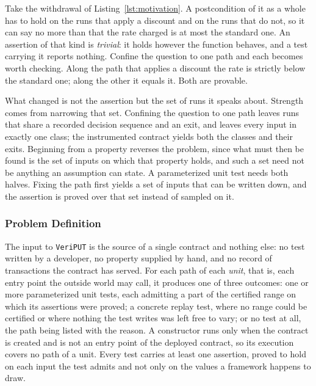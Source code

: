 \documentclass[manuscript,anonymous]{acmart}
\newcommand{\tool}[1]{\texttt{#1}}
\begin{document}
Take the withdrawal of Listing~\ref{lst:motivation}. A postcondition of it as a
whole has to hold on the runs that apply a discount and on the runs that do not,
so it can say no more than that the rate charged is at most the standard one. An
assertion of that kind is \emph{trivial}: it holds however the function behaves,
and a test carrying it reports nothing. Confine the question to one path and
each becomes worth checking. Along the path that applies a discount the rate is
strictly below the standard one; along the other it equals it. Both are
provable.

What changed is not the assertion but the set of runs it speaks about. Strength
comes from narrowing that set. Confining the question to one path leaves runs
that share a recorded decision sequence and an exit, and leaves every input in
exactly one class; the instrumented contract yields both the classes and their
exits. Beginning from a property reverses the problem, since what must
then be found is the set of inputs on which that property holds, and such a set
need not be anything an assumption can state. A parameterized unit test needs
both halves. Fixing the path first yields a set of inputs that can be written
down, and the assertion is proved over that set instead of sampled on it.

\subsubsection{Problem Definition}\label{sec:task-def}

The input to \tool{VeriPUT} is the source of a single contract and nothing
else: no test written by a developer, no property supplied by hand, and no
record of transactions the contract has served. For each path of each
\emph{unit}, that is, each entry point the outside world may call, it produces
one of three outcomes: one or more parameterized unit tests, each admitting a
part of the certified range on which its assertions were proved; a concrete
replay test, where no range could be certified or where nothing the test writes
was left free to vary; or no test at all, the path being listed with the
reason. A constructor runs only when the contract is created and is not an
entry point of the deployed contract, so its execution covers no path of a
unit. Every test carries at least one assertion, proved to hold on each input
the test admits and not only on the values a framework happens to draw.
\end{document}
